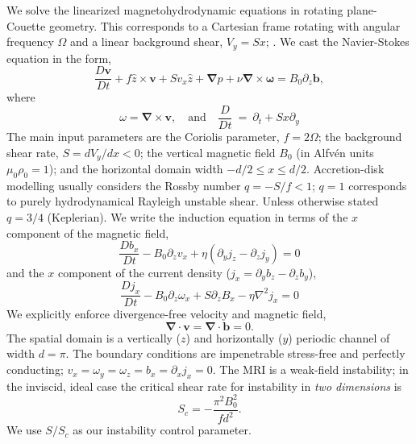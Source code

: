 \documentclass[aps,prl,reprint,superscriptaddress]{revtex4-1}
\newcommand{\SSC}{S/S_{c}}
\begin{document}
We solve the linearized magnetohydrodynamic equations in rotating plane-Couette geometry.
This corresponds to a Cartesian frame rotating with angular frequency $\Omega$ and a linear background shear, $V_{y} = Sx$; \citep[see][]{2015RSPSA.47140699V}.
We cast the Navier-Stokes equation in the form,
\begin{equation}
  \label{eq:mhd}
  \frac{D \mathbf{v}}{Dt} + f \hat{z} \times \mathbf{v} + S v_x \hat{z} + \mathbf{\nabla}{p} + \nu \mathbf{\nabla} \times \mathbf{\omega} = B_{0} \partial_{z} \mathbf{b},
\end{equation}
where
\begin{equation}
\omega = \mathbf{\nabla} \times \mathbf{v}, \quad \text{and} \quad \frac{D}{Dt} \ = \ \partial_{t} + S x \partial_{y}
\end{equation}
The main input parameters are the Coriolis parameter, $f = 2 \Omega$; the background shear rate, $S = dV_{y}/dx < 0$;  the vertical magnetic field $B_{0}$ (in Alfv\'{e}n units $\mu_{0} \rho_{0} = 1$); and the horizontal domain width $-d/2 \le x \le d/2$.
Accretion-disk modelling usually considers the Rossby number $q = -S/f < 1$; $q=1$ corresponds to purely hydrodynamical Rayleigh unstable shear.
Unless otherwise stated $q = 3/4$ (Keplerian).
We write the induction equation in terms of the $x$ component of the magnetic field,
\begin{equation}
  \label{eq:Bx}
  \frac{D b_x}{Dt} - B_0 \partial_z v_x + \eta (\partial_y j_z - \partial_z j_y) = 0
\end{equation}
and the $x$ component of the current density ($j_{x} = \partial_{y}b_{z} - \partial_{z} b_{y}$),
\begin{equation}
  \label{eq:Jx}
  \frac{D j_x}{Dt} - B_0 \partial_z \omega_x + S \partial_z B_x - \eta \nabla^2 j_x = 0
\end{equation}
We explicitly enforce divergence-free velocity and magnetic field,
\begin{equation}
  \label{eq:divu}
  \mathbf{\nabla} \cdot \mathbf{v} = \mathbf{\nabla} \cdot \mathbf{b} = 0.
\end{equation}
The spatial domain is a vertically ($z$) and horizontally ($y$) periodic channel of width $d = \pi$. 
The boundary conditions are impenetrable stress-free and perfectly conducting; $v_{x} = \omega_{y} = \omega_{z} = b_{x} = \partial_{x}j_{x} = 0$. 
The MRI is a weak-field instability; in the inviscid, ideal case the critical shear rate for instability in \textit{two dimensions} is
\begin{equation}
  \label{eq:Sc}
  S_c = -\frac{\pi^2 B_{0}^2}{f d^2}.
\end{equation}
We use $\SSC$ as our instability control parameter. 
\end{document}
